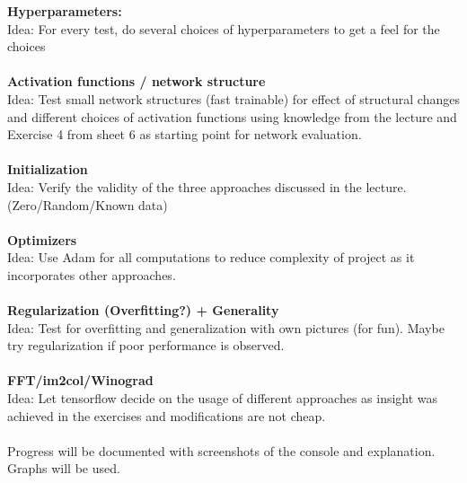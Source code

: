 \documentclass[]{article}
\begin{document}
\textbf{Hyperparameters:}\\
Idea: For every test, do several choices of hyperparameters to get a feel for the choices\\
\\
\textbf{Activation functions / network structure}\\
Idea: Test small network structures (fast trainable) for effect of structural changes and different choices of activation functions using knowledge from the lecture and Exercise 4 from sheet 6 as starting point for network evaluation.\\
\\
\textbf{Initialization}\\
Idea: Verify the validity of the three approaches discussed in the lecture. (Zero/Random/Known data)\\
\\
\textbf{Optimizers}\\
Idea: Use Adam for all computations to reduce complexity of project as it incorporates other approaches.\\
\\
\textbf{Regularization (Overfitting?) + Generality}\\
Idea: Test for overfitting and generalization with own pictures (for fun). Maybe try regularization if poor performance is observed.\\
\\
\textbf{FFT/im2col/Winograd}\\
Idea: Let tensorflow decide on the usage of different approaches as insight was achieved in the exercises and modifications are not cheap.\\
\\

Progress will be documented with screenshots of the console and explanation. Graphs will be used.
\end{document}
